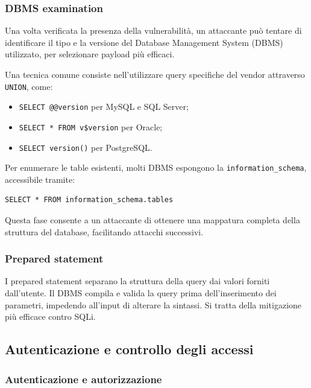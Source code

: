 \subsubsection{DBMS examination}

Una volta verificata la presenza della vulnerabilità, un attaccante può tentare di identificare il tipo e la versione del Database Management System (DBMS) utilizzato, per selezionare payload più efficaci.

Una tecnica comune consiste nell’utilizzare query specifiche del vendor attraverso \texttt{UNION}, come:
\begin{itemize}
    \item \texttt{SELECT @@version} per MySQL e SQL Server;
    \item \texttt{SELECT * FROM v\$version} per Oracle;
    \item \texttt{SELECT version()} per PostgreSQL.
\end{itemize}

Per enumerare le table esistenti, molti DBMS espongono la \texttt{information\_schema}, accessibile tramite:
\begin{verbatim}
SELECT * FROM information_schema.tables
\end{verbatim}
Questa fase consente a un attaccante di ottenere una mappatura completa della struttura del database, facilitando attacchi successivi.

\subsubsection{Prepared statement}

I prepared statement separano la struttura della query dai valori forniti dall’utente. Il DBMS compila e valida la query prima dell’inserimento dei parametri, impedendo all’input di alterare la sintassi.
Si tratta della mitigazione più efficace contro SQLi.

\subsection{Autenticazione e controllo degli accessi}

\subsubsection{Autenticazione e autorizzazione}

